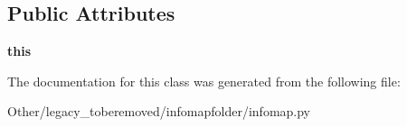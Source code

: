 \subsection*{Public Attributes}
\begin{DoxyCompactItemize}
\item 
\mbox{\label{classinfomapfolder_1_1infomap_1_1MemNetwork_ada9fccdb220cf035ef58d6b8304f3e91}} 
{\bfseries this}
\end{DoxyCompactItemize}


The documentation for this class was generated from the following file\+:\begin{DoxyCompactItemize}
\item 
Other/legacy\+\_\+toberemoved/infomapfolder/infomap.\+py\end{DoxyCompactItemize}
